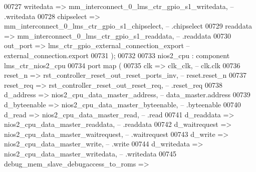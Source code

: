 \begin{DoxyCode}
00727             writedata  => mm_interconnect_0_lms_ctr_gpio_s1_writedata,\textcolor{keyword}{       --                   
       .writedata}
00728             chipselect => mm_interconnect_0_lms_ctr_gpio_s1_chipselect,\textcolor{keyword}{      --                   
       .chipselect}
00729             readdata   => mm_interconnect_0_lms_ctr_gpio_s1_readdata,\textcolor{keyword}{        --                   
       .readdata}
00730             out\_port   => lms_ctr_gpio_external_connection_export            \textcolor{keyword}{-- external\_connection.export}
00731         \textcolor{vhdlchar}{)};
00732 
00733     nios2_cpu : \textcolor{keywordflow}{component} lms\_ctr\_nios2\_cpu
00734         \textcolor{keywordflow}{port} \textcolor{keywordflow}{map} (
00735             clk                                 => clk_clk,\textcolor{keyword}{                                                
       --                       clk.clk}
00736             reset\_n                             => 
      rst_controller_reset_out_reset_ports_inv,\textcolor{keyword}{                --                     reset.reset\_n}
00737             reset\_req                           => 
      rst_controller_reset_out_reset_req,\textcolor{keyword}{                      --                          .reset\_req}
00738             d\_address                           => nios2_cpu_data_master_address,\textcolor{keyword}{                          
       --               data\_master.address}
00739             d\_byteenable                        => 
      nios2_cpu_data_master_byteenable,\textcolor{keyword}{                        --                          .byteenable}
00740             d\_read                              => nios2_cpu_data_master_read,\textcolor{keyword}{                             
       --                          .read}
00741             d\_readdata                          => 
      nios2_cpu_data_master_readdata,\textcolor{keyword}{                          --                          .readdata}
00742             d\_waitrequest                       => 
      nios2_cpu_data_master_waitrequest,\textcolor{keyword}{                       --                          .waitrequest}
00743             d\_write                             => nios2_cpu_data_master_write,\textcolor{keyword}{                            
       --                          .write}
00744             d\_writedata                         => 
      nios2_cpu_data_master_writedata,\textcolor{keyword}{                         --                          .writedata}
00745             debug\_mem\_slave\_debugaccess\_to\_roms => 

\end{DoxyCode}
